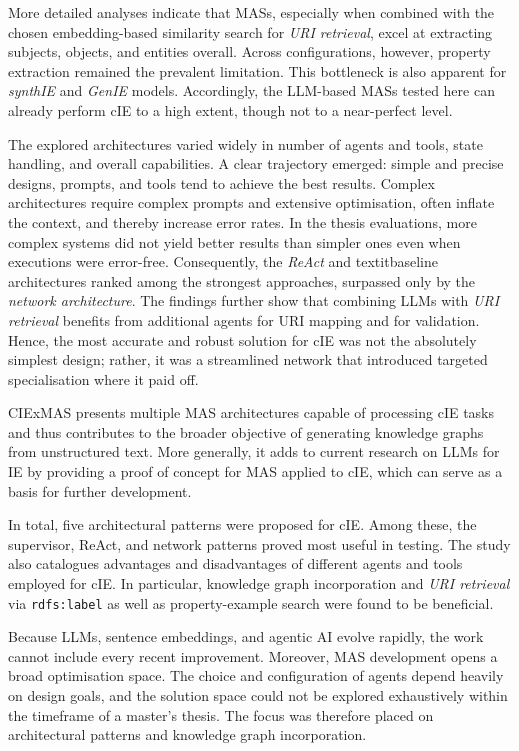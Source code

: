 \documentclass[a4paper,oneside,bibliography=totoc]{scrbook}
\begin{document}
More detailed analyses indicate that \acp{MAS}, especially when combined with the chosen embedding-based similarity search for \textit{URI retrieval}, excel at extracting subjects, objects, and entities overall. Across configurations, however, property extraction remained the prevalent limitation. This bottleneck is also apparent for \textit{synthIE} and \textit{GenIE} models. Accordingly, the \ac{LLM}-based \acp{MAS} tested here can already perform \ac{cIE} to a high extent, though not to a near-perfect level.

The explored architectures varied widely in number of agents and tools, state handling, and overall capabilities. A clear trajectory emerged: simple and precise designs, prompts, and tools tend to achieve the best results. Complex architectures require complex prompts and extensive optimisation, often inflate the context, and thereby increase error rates. In the thesis evaluations, more complex systems did not yield better results than simpler ones even when executions were error-free. Consequently, the \textit{ReAct} and textit{baseline architectures} ranked among the strongest approaches, surpassed only by the \textit{network architecture}. The findings further show that combining \acp{LLM} with \textit{URI retrieval} benefits from additional agents for URI mapping and for validation. Hence, the most accurate and robust solution for \ac{cIE} was not the absolutely simplest design; rather, it was a streamlined network that introduced targeted specialisation where it paid off.

CIExMAS presents multiple \ac{MAS} architectures capable of processing \ac{cIE} tasks and thus contributes to the broader objective of generating knowledge graphs from unstructured text. More generally, it adds to current research on \acp{LLM} for \ac{IE} by providing a proof of concept for \ac{MAS} applied to \ac{cIE}, which can serve as a basis for further development.

In total, five architectural patterns were proposed for \ac{cIE}. Among these, the supervisor, ReAct, and network patterns proved most useful in testing. The study also catalogues advantages and disadvantages of different agents and tools employed for \ac{cIE}. In particular, knowledge graph incorporation and \textit{URI retrieval} via \texttt{rdfs:label} as well as property-example search were found to be beneficial.

Because \acp{LLM}, sentence embeddings, and agentic AI evolve rapidly, the work cannot include every recent improvement. Moreover, \ac{MAS} development opens a broad optimisation space. The choice and configuration of agents depend heavily on design goals, and the solution space could not be explored exhaustively within the timeframe of a master’s thesis. The focus was therefore placed on architectural patterns and knowledge graph incorporation.
\end{document}
